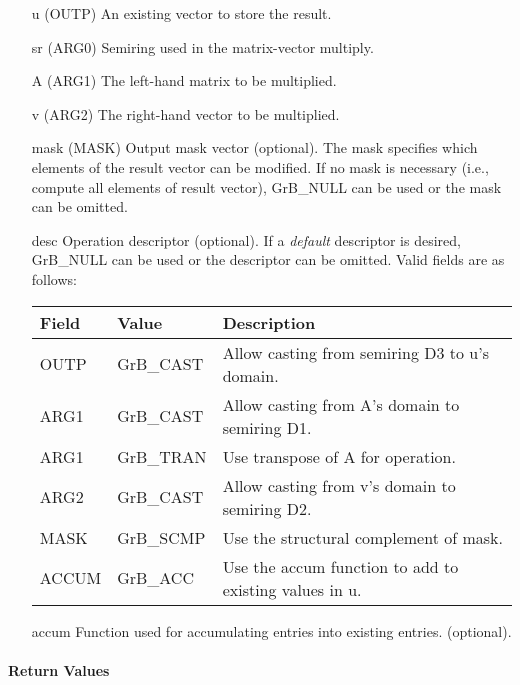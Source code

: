 \begin{itemize}[leftmargin=1.1in]
    \item[{\sf u}]    ({\sf OUTP}) An existing vector to store the result.
    \item[{\sf sr}]   ({\sf ARG0}) Semiring used in the matrix-vector multiply.
    \item[{\sf A}]    ({\sf ARG1}) The left-hand matrix to be multiplied.
    \item[{\sf v}]    ({\sf ARG2}) The right-hand vector to be multiplied.

    \item[{\sf mask}] ({\sf MASK}) Output mask vector (optional). The mask
    specifies which elements of the result vector can be modified.
    If no mask is necessary (i.e., compute all elements of result
    vector), {\sf GrB\_NULL} can be used or the mask can be omitted.

    \item[{\sf desc}]  Operation descriptor (optional). If a
    \emph{default} descriptor is desired, {\sf GrB\_NULL} can be
    used or the descriptor can be omitted. Valid fields are as follows: \\
    \begin{tabular}{lll}
    Field  & Value & Description \\
    \hline
    {\sf OUTP} & {\sf GrB\_CAST} & Allow casting from semiring D3 to {\sf u}'s domain. \\
    {\sf ARG1} & {\sf GrB\_CAST} & Allow casting from {\sf A}'s domain to semiring D1. \\
    {\sf ARG1} & {\sf GrB\_TRAN} & Use transpose of {\sf A} for operation. \\
    {\sf ARG2} & {\sf GrB\_CAST} & Allow casting from {\sf v}'s domain to semiring D2. \\
    {\sf MASK} & {\sf GrB\_SCMP} & Use the structural complement of {\sf mask}. \\
    {\sf ACCUM}& {\sf GrB\_ACC}  & Use the {\sf accum} function to add to existing values in {\sf u}.\\
    \end{tabular}

  	\item[{\sf accum}]  Function used for accumulating entries into existing  entries. (optional). 
\end{itemize}

\paragraph{Return Values}

